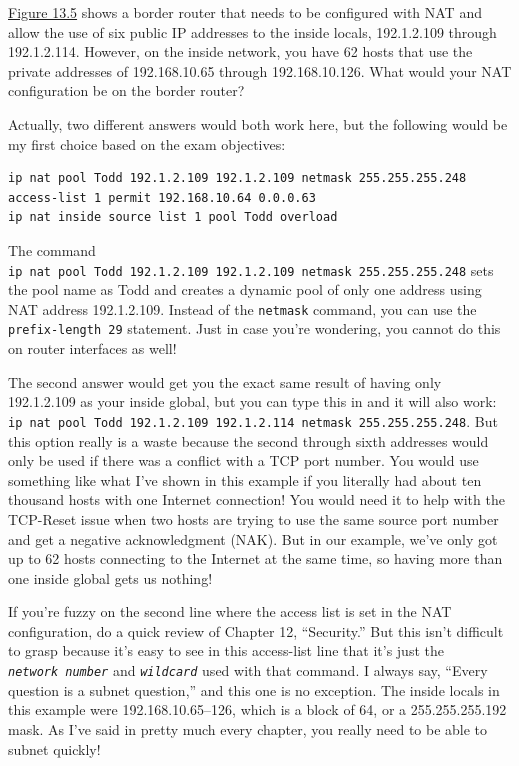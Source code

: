 \documentclass[b5paper,11pt]{memoir}
\begin{document}
\protect\hyperlink{c13.xhtmlux5cux23figure13-5}{Figure
13.5} shows a border router that needs to be configured with NAT and
allow the use of six public IP addresses to the inside locals,
192.1.2.109 through 192.1.2.114. However, on the inside network, you
have 62 hosts that use the private addresses of 192.168.10.65 through
192.168.10.126. What would your NAT configuration be on the border
router?

Actually, two different answers would both work here, but the following
would be my first choice based on the exam objectives:

\begin{verbatim}
ip nat pool Todd 192.1.2.109 192.1.2.109 netmask 255.255.255.248
access-list 1 permit 192.168.10.64 0.0.0.63
ip nat inside source list 1 pool Todd overload
\end{verbatim}

The command
\texttt{ip\ nat\ pool\ Todd\ 192.1.2.109\ 192.1.2.109\ netmask\ 255.255.255.248}
sets the pool name as Todd and creates a dynamic pool of only one
address using NAT address 192.1.2.109. Instead of the \texttt{netmask}
command, you can use the \texttt{prefix-length\ 29} statement. Just in
case you're wondering, you cannot do this on router interfaces as well!

The second answer would get you the exact same result of having only
192.1.2.109 as your inside global, but you can type this in and it will
also work:
\texttt{ip\ nat\ pool\ Todd\ 192.1.2.109\ 192.1.2.114\ netmask\ 255.255.255.248}.
But this option really is a waste because the second through sixth
addresses would only be used if there was a conflict with a TCP port
number. You would use something like what I've shown in this example if
you literally had about ten thousand hosts with one Internet connection!
You would need it to help with the TCP-Reset issue when two hosts are
trying to use the same source port number and get a negative
acknowledgment (NAK). But in our example, we've only got up to 62 hosts
connecting to the Internet at the same time, so having more than one
inside global gets us nothing!

If you're fuzzy on the second line where the access list is set in the
NAT configuration, do a quick review of Chapter 12, ``Security.'' But
this isn't difficult to grasp because it's easy to see in this
access-list line that it's just the \emph{\texttt{network\ number}} and
\emph{\texttt{wildcard}} used with that command. I always say, ``Every
question is a subnet question,'' and this one is no exception. The
inside locals in this example were 192.168.10.65--126, which is a block
of 64, or a 255.255.255.192 mask. As I've said in pretty much every
chapter, you really need to be able to subnet quickly!
\end{document}
